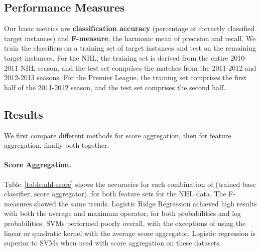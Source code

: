 \documentclass[oribibl]{llncs}%
\begin{document}
%


\subsection{Performance Measures} Our basic metrics are \textbf{classification accuracy} (percentage of correctly classified target instances) and \textbf{F-measure}, the harmonic mean of precision and recall. We train the classifiers on a training set of target instances and test on the remaining target instances. For the NHL, the training set is derived from the entire 2010-2011 NHL season, and the test set comprises the matches from the 2011-2012 and 2012-2013 seasons. For the Premier League, the training set comprises the first half of the 2011-2012 season, and the test set comprises the second half.



\subsection{Results}
We first compare different methods for score aggregation, then for feature aggregation, finally both together.

\paragraph{Score Aggregation.} Table~\ref{table:nhl-score} shows the accuracies for each combination of (trained base classifier, score aggregator), for both feature sets for the NHL data. The F-measures showed the same trends. Logistic Ridge Regression achieved high results with both the average and maximum operator, for both probabilities and log probabilities. SVMs performed poorly overall, with the exceptions of using the linear or quadratic kernel with the average score aggregator. Logistic regression is superior to SVMs when used with score aggregation on these datasets. 
\end{document}
